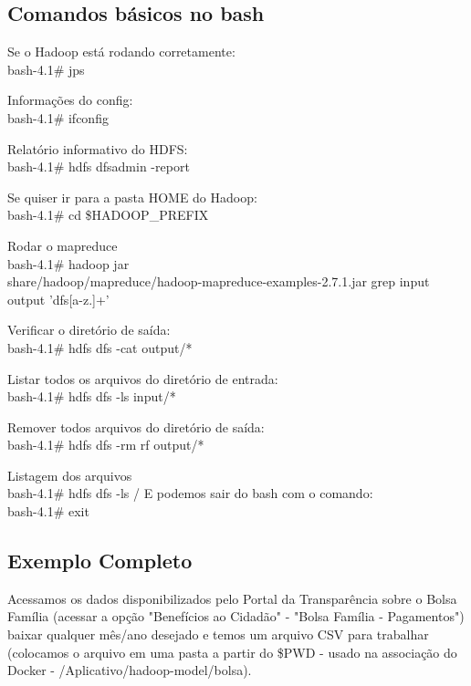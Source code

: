 \documentclass[a4paper,11pt]{article}
\begin{document}
\subsection{Comandos básicos no bash}
Se o Hadoop está rodando corretamente: \\
{\ttfamily bash-4.1\# jps}

Informações do config: \\
{\ttfamily bash-4.1\# ifconfig}

Relatório informativo do HDFS: \\
{\ttfamily bash-4.1\# hdfs dfsadmin -report}

Se quiser ir para a pasta HOME do Hadoop: \\
{\ttfamily bash-4.1\# cd \$HADOOP\_PREFIX}

Rodar o mapreduce \\
{\ttfamily bash-4.1\# hadoop jar \\ share/hadoop/mapreduce/hadoop-mapreduce-examples-2.7.1.jar grep input \\ output 'dfs[a-z.]+'}

Verificar o diretório de saída: \\
{\ttfamily bash-4.1\# hdfs dfs -cat output/*}

Listar todos os arquivos do diretório de entrada: \\
{\ttfamily bash-4.1\# hdfs dfs -ls input/*}

Remover todos arquivos do diretório de saída: \\
{\ttfamily bash-4.1\# hdfs dfs -rm rf  output/*}

Listagem dos arquivos \\
{\ttfamily bash-4.1\# hdfs dfs -ls /}
E podemos sair do bash com o comando: \\
{\ttfamily bash-4.1\# exit}

\subsection{Exemplo Completo}
Acessamos os dados disponibilizados pelo Portal da Transparência\cite{portaltransp} sobre o Bolsa Família (acessar a opção "Benefícios ao Cidadão" - "Bolsa Família - Pagamentos") baixar qualquer mês/ano desejado e temos um arquivo CSV para trabalhar (colocamos o arquivo em uma pasta a partir do \$PWD - usado na associação do Docker - /Aplicativo/hadoop-model/bolsa).
\end{document}
